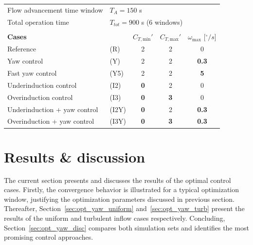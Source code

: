 \begin{table}
\begin{tabular}{llccc}
		Flow advancement time window 	& \multicolumn{4}{l}{$T_A = 150$ s}\\
		Total operation time         	& \multicolumn{4}{l}{$T_{tot} = 900$ s (6 windows)}\\
		& & & & \\	
		\textbf{Cases} & \  & $C_{T,\text{min}}'$ & $C_{T,\text{max}}'$ & $\omega_{\text{max}}$ [$^\circ/s$] \\ 
		Reference & (R)    &  2 & 2 & 0   \\ 
		Yaw control & (Y)   &  2 & 2 & \textbf{0.3} \\ 
		Fast yaw control & (Y5)   &  2 & 2 &\textbf{5}   \\ 
		Underinduction control & (I2)    &  \textbf{0} & 2 & 0\\
		Overinduction control & (I3)    &  \textbf{0} & \textbf{3} & 0\\ 
		Underinduction + yaw control & (I2Y)   &  \textbf{0} & 2 & \textbf{0.3} \\ 
		Overinduction + yaw control & (I3Y)   &  \textbf{0} & \textbf{3} & \textbf{0.3} \\ 
		\hline 
	\end{tabular} 
\end{table}









\section{Results \& discussion}\label{sec:opt_yaw_results}
The current section presents and discusses the results of the optimal control cases. Firstly, the convergence behavior is illustrated for a typical optimization window, justifying the optimization parameters discussed in previous section. Thereafter, Section~\ref{sec:opt_yaw_uniform} and~\ref{sec:opt_yaw_turb} present the results of the uniform and turbulent inflow cases respectively. Concluding, Section~\ref{sec:opt_yaw_disc} compares both simulation sets and identifies the most promising control approaches.

